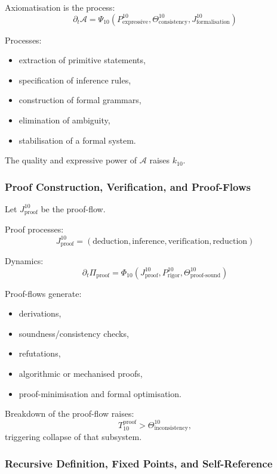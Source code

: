 Axiomatisation is the process:
\[
\partial_t \mathcal{A} 
= \Psi_{10}(P^{10}_{\text{expressive}}, 
            \Theta^{10}_{\text{consistency}},
            J^{10}_{\text{formalisation}})
\]

Processes:
\begin{itemize}
    \item extraction of primitive statements,
    \item specification of inference rules,
    \item construction of formal grammars,
    \item elimination of ambiguity,
    \item stabilisation of a formal system.
\end{itemize}

The quality and expressive power of $\mathcal{A}$ raises $k_{10}$.

\subsubsection{Proof Construction, Verification, and Proof-Flows}

Let $J^{10}_{\text{proof}}$ be the proof-flow.

Proof processes:
\[
J^{10}_{\text{proof}} = 
(\text{deduction}, \text{inference}, \text{verification}, \text{reduction})
\]

Dynamics:
\[
\partial_t \Pi_{\text{proof}} 
= \Phi_{10}(J^{10}_{\text{proof}}, 
            P^{10}_{\text{rigor}}, 
            \Theta^{10}_{\text{proof-sound}})
\]

Proof-flows generate:
\begin{itemize}
    \item derivations,
    \item soundness/consistency checks,
    \item refutations,
    \item algorithmic or mechanised proofs,
    \item proof-minimisation and formal optimisation.
\end{itemize}

Breakdown of the proof-flow raises:
\[
T_{10}^{\text{proof}} > \Theta^{10}_{\text{inconsistency}},
\]
triggering collapse of that subsystem.

\subsubsection{Recursive Definition, Fixed Points, and Self-Reference}

